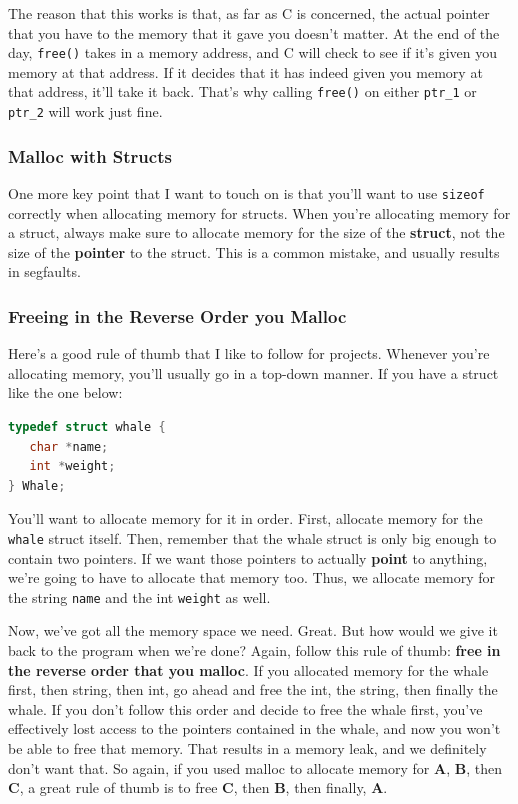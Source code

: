 \documentclass[english, 10pt]{article}
\begin{document}
The reason that this works is that, as far as C is concerned, the actual pointer that you have to the memory that it gave you doesn't matter. At the end of the day, \texttt{free()} takes in a memory address, and C will check to see if it's given you memory at that address. If it decides that it has indeed given you memory at that address, it'll take it back. That's why calling \texttt{free()} on either \texttt{ptr\_1} or \texttt{ptr\_2} will work just fine.

\subsubsection{Malloc with Structs}

One more key point that I want to touch on is that you'll want to use \texttt{sizeof} correctly when allocating memory for structs. When you're allocating memory for a struct, always make sure to allocate memory for the size of the \textbf{struct}, not the size of the \textbf{pointer} to the struct. This is a common mistake, and usually results in segfaults.\newline

\subsubsection{Freeing in the Reverse Order you Malloc}

Here's a good rule of thumb that I like to follow for projects. Whenever you're allocating memory, you'll usually go in a top-down manner. If you have a struct like the one below:\newline

\begin{lstlisting}[language=C]
 typedef struct whale {
   char *name;
   int *weight;
} Whale;
\end{lstlisting}

You'll want to allocate memory for it in order. First, allocate memory for the \texttt{whale} struct itself. Then, remember that the whale struct is only big enough to contain two pointers. If we want those pointers to actually \textbf{point} to anything, we're going to have to allocate that memory too. Thus, we allocate memory for the string \texttt{name} and the int \texttt{weight} as well.\newline

Now, we've got all the memory space we need. Great. But how would we give it back to the program when we're done? Again, follow this rule of thumb: \textbf{free in the reverse order that you malloc}. If you allocated memory for the whale first, then string, then int, go ahead and free the int, the string, then finally the whale. If you don't follow this order and decide to free the whale first, you've effectively lost access to the pointers contained in the whale, and now you won't be able to free that memory. That results in a memory leak, and we definitely don't want that. So again, if you used malloc to allocate memory for \textbf{A}, \textbf{B}, then \textbf{C}, a great rule of thumb is to free \textbf{C}, then \textbf{B}, then finally, \textbf{A}.
\end{document}
